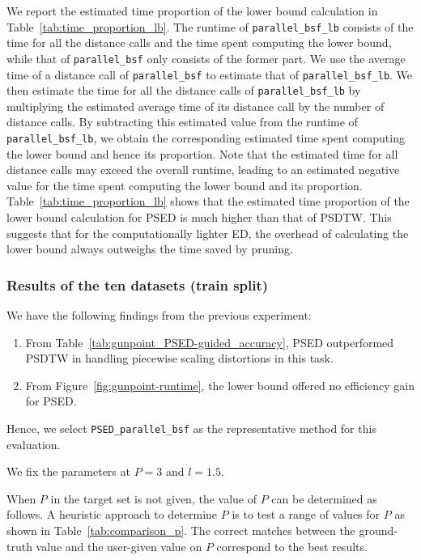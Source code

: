 
We report the estimated time proportion of the lower bound calculation in Table~\ref{tab:time_proportion_lb}.
%
The runtime of \texttt{parallel\_bsf\_lb} consists of the time for all the distance calls and the time spent computing the lower bound, while that of \texttt{parallel\_bsf} only consists of the former part.
%
We use the average time of a distance call of \texttt{parallel\_bsf} to estimate that of \texttt{parallel\_bsf\_lb}.
We then estimate the time for all the distance calls of \texttt{parallel\_bsf\_lb} by multiplying the estimated average time of its distance call by the number of distance calls.
By subtracting this estimated value from the runtime of \texttt{parallel\_bsf\_lb}, we obtain the corresponding estimated time spent computing the lower bound and hence its proportion.
Note that the estimated time for all distance calls may exceed the overall runtime, leading to an estimated negative value for the time spent computing the lower bound and its proportion.
%
Table~\ref{tab:time_proportion_lb} shows that the estimated time proportion of the lower bound calculation for PSED is much higher than that of PSDTW.
This suggests that for the computationally lighter ED, the overhead of calculating the lower bound always outweighs the time saved by pruning.

\subsubsection{Results of the ten datasets (train split)} %

We have the following findings from the previous experiment:
\begin{enumerate}
    \item From Table~\ref{tab:gunpoint_PSED-guided_accuracy}, PSED outperformed PSDTW in handling piecewise scaling distortions in this task.
    \item From Figure~\ref{fig:gunpoint-runtime}, the lower bound offered no efficiency gain for PSED.
\end{enumerate}
Hence, we select \texttt{PSED\_parallel\_bsf} as the representative method for this evaluation.

We fix the parameters at $P=3$ and $l=1.5$. 

When $P$ in the target set is not given, the value of $P$ can be determined as follows.
A heuristic approach to determine $P$ is to test a range of values for $P$ as shown in Table~\ref{tab:comparison_p}.
The correct matches between the ground-truth value and the user-given value on $P$ correspond to the best results.

